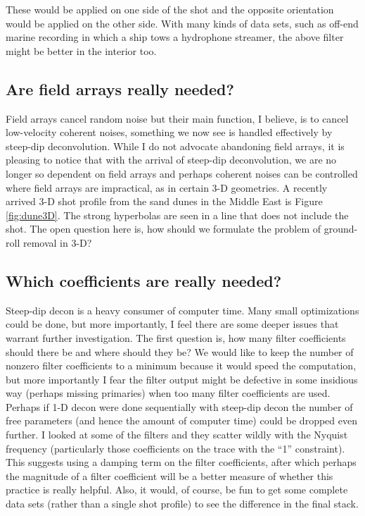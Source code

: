 \noindent
These would be applied on one side of the shot
and the opposite orientation would be applied on the other side.
With many kinds of data sets,
such as off-end marine recording in which
a ship tows a hydrophone streamer,
the above filter might be better in the interior too.

\subsection{Are field arrays really needed?}
Field arrays
cancel random noise but their main function,
I believe, is to cancel low-velocity coherent noises,
something we now see is handled effectively by steep-dip deconvolution.
While I do not advocate abandoning field arrays,
it is pleasing to notice that with the arrival of steep-dip deconvolution,
we are no longer so dependent on field arrays
and perhaps coherent noises can be controlled
where field arrays are impractical,
as in certain 3-D geometries.
A recently arrived 3-D shot profile from the sand dunes
in the Middle East is Figure \ref{fig:dune3D}.
The strong hyperbolas are  seen in a line
that does not include the shot.
The open question here is,
how should we formulate the problem of ground-roll removal in 3-D?

\subsection{Which coefficients are really needed?}
Steep-dip decon is a heavy consumer of computer time.
Many small optimizations could be done,
but more importantly,
I feel there are some deeper issues that warrant further investigation.
The first question is,
how many filter coefficients should there be
and where should they be? 
We would like to keep the number of nonzero filter coefficients to a minimum
because it would speed the computation,
but more importantly I fear the filter output
might be defective in some insidious way (perhaps missing primaries)
when too many filter coefficients are used.
Perhaps if 1-D decon were done sequentially with steep-dip decon
the number of free parameters (and hence the amount of computer time)
could be dropped even further.
I looked at some of the filters
and they scatter wildly with the Nyquist frequency
(particularly those coefficients on the trace with the ``1'' constraint).
This suggests using a damping term on the filter coefficients,
after which perhaps the magnitude of a filter coefficient
will be a better measure of whether this practice is really helpful.
Also, it would, of course, be fun to get some complete data sets
(rather than a single shot profile) to see the difference in the final stack.

